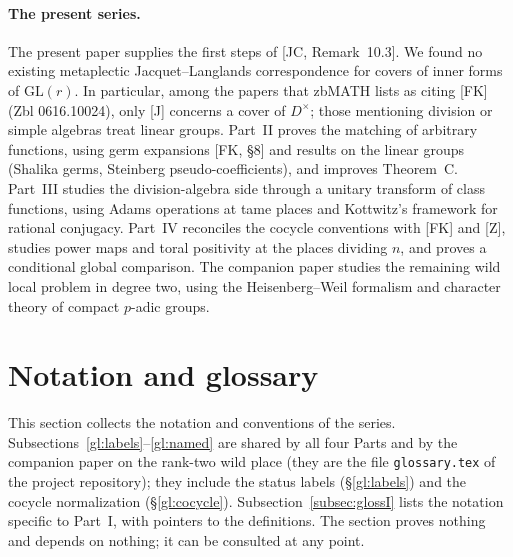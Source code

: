 \documentclass[12pt]{article}
\newcommand{\GL}{\mathrm{GL}}
\theoremstyle{plain}
\theoremstyle{definition}
\begin{document}
\paragraph{The present series.} The present paper supplies the first steps of [JC, Remark~10.3]. We found no existing metaplectic Jacquet--Langlands correspondence for covers of inner forms of $\GL(r)$. In particular, among the papers that zbMATH lists as citing [FK] (Zbl 0616.10024), only [J] concerns a cover of $D^\times$; those mentioning division or simple algebras treat linear groups. Part~II proves the matching of arbitrary functions, using germ expansions [FK, \S8] and results on the linear groups (Shalika germs, Steinberg pseudo-coefficients), and improves Theorem~C. Part~III studies the division-algebra side through a unitary transform of class functions, using Adams operations at tame places and Kottwitz's framework for rational conjugacy. Part~IV reconciles the cocycle conventions with [FK] and [Z], studies power maps and toral positivity at the places dividing $n$, and proves a conditional global comparison. The companion paper studies the remaining wild local problem in degree two, using the Heisenberg--Weil formalism and character theory of compact $p$-adic groups.

\section{Notation and glossary}\label{sec:glossary}
This section collects the notation and conventions of the series. Subsections~\ref{gl:labels}--\ref{gl:named} are shared by all four Parts and by the companion paper on the rank-two wild place (they are the file \texttt{glossary.tex} of the project repository); they include the status labels (\S\ref{gl:labels}) and the cocycle normalization (\S\ref{gl:cocycle}). Subsection~\ref{subsec:glossI} lists the notation specific to Part~I, with pointers to the definitions. The section proves nothing and depends on nothing; it can be consulted at any point.


\end{document}
